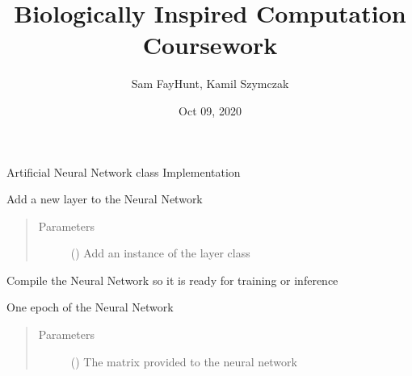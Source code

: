 \documentclass[letterpaper,10pt,english]{sphinxmanual}
\title{Biologically Inspired Computation Coursework}
\date{Oct 09, 2020}
\author{Sam Fay\sphinxhyphen{}Hunt, Kamil Szymczak}
\begin{document}
\pagestyle{empty}
\sphinxmaketitle
\pagestyle{plain}
\sphinxtableofcontents
\pagestyle{normal}
\label{\detokenize{index::doc}}


\begin{fulllineitems}
\label{\detokenize{index:Coursework.model.ANN}}
Artificial Neural Network class Implementation

\begin{fulllineitems}
\label{\detokenize{index:Coursework.model.ANN.add}}
Add a new layer to the Neural Network
\begin{quote}\begin{description}
\item[{Parameters}] \leavevmode
{} ({\hyperref[\detokenize{index:Coursework.model.Layer}]{}}) \textendash{} Add an instance of the layer class

\end{description}\end{quote}

\end{fulllineitems}


\begin{fulllineitems}
\label{\detokenize{index:Coursework.model.ANN.compile}}
Compile the Neural Network so it is ready for training or inference

\end{fulllineitems}


\begin{fulllineitems}
\label{\detokenize{index:Coursework.model.ANN.epoch}}
One epoch of the Neural Network
\begin{quote}\begin{description}
\item[{Parameters}] \leavevmode
{} () \textendash{} The matrix provided to the neural network


\end{description}
\end{quote}
\end{fulllineitems}
\end{fulllineitems}
\end{document}
